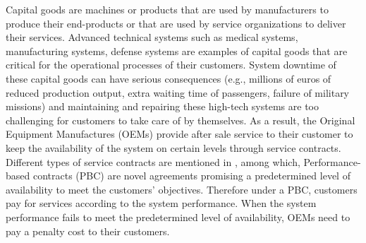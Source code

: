 \documentclass[preprint,12pt]{elsarticle}
\begin{document}
Capital goods are machines or products that are used by manufacturers to produce their end-products or that are used by service organizations to deliver their services. Advanced technical systems such as medical systems, manufacturing systems, defense systems are examples of capital goods that are critical for the operational processes of their customers. System downtime of these capital goods can have serious consequences (e.g., millions of euros of reduced production output, extra waiting time of passengers, failure of military missions) and maintaining and repairing these high-tech systems are too challenging for customers to take care of by themselves. As a result, the Original Equipment Manufactures (OEMs) provide after sale service to their customer to keep the availability of the system on certain levels through service contracts. Different types of service contracts are mentioned in \citet{Cohen2006}, among which, Performance-based contracts (PBC) are novel agreements promising a predetermined level of availability to meet the customers' objectives. Therefore under a PBC, customers pay for services according to the system performance. When the system performance fails to meet the predetermined level of availability, OEMs need to pay a penalty cost to their customers.


\end{document}
